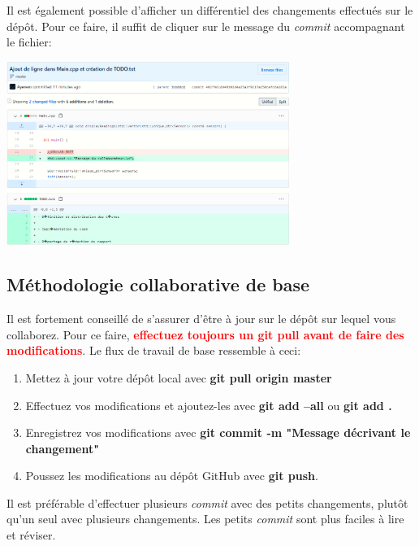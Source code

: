 \documentclass{article}
\begin{document}
\begin{flushleft}
Il est également possible d'afficher un différentiel des changements effectués sur le dépôt. Pour ce faire, il suffit de cliquer sur le message du \textit{commit} accompagnant le fichier:
\end{flushleft}
\includegraphics[width=0.69\textwidth, center]{GitHub_Diff}

\subsection{Méthodologie collaborative de base}

Il est fortement conseillé de s'assurer d'être à jour sur le dépôt sur lequel vous collaborez. Pour ce faire, \textcolor{Red}{\textbf{effectuez toujours un git pull avant de faire des modifications}}. Le flux de travail de base ressemble à ceci:
\begin{enumerate}
    \item Mettez à jour votre dépôt local avec \textbf{git pull origin master}
    \item Effectuez vos modifications et ajoutez-les avec \textbf{git add --all} ou \textbf{git add .}
    \item Enregistrez vos modifications avec \textbf{git commit -m "Message décrivant le changement"}
    \item Poussez les modifications au dépôt GitHub avec \textbf{git push}.
\end{enumerate}
Il est préférable d'effectuer plusieurs \textit{commit} avec des petits changements, plutôt qu'un seul avec plusieurs changements. Les petits \textit{commit} sont plus faciles à lire et réviser.
\end{document}
